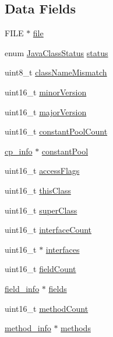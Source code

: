\subsection*{Data Fields}
\begin{DoxyCompactItemize}
\item 
F\+I\+LE $\ast$ \hyperlink{structJavaClass_a24301fe0d812773595ca16c4ee658318}{file}
\item 
enum \hyperlink{javaclass_8h_a9b332e6330d199c30e246d4ad8bff5ac}{Java\+Class\+Status} \hyperlink{structJavaClass_aba868ba95744ed4200bd5bba1ad31ffc}{status}
\item 
uint8\+\_\+t \hyperlink{structJavaClass_ae51618e3eb35bfce4a1267d57a686259}{class\+Name\+Mismatch}
\item 
uint16\+\_\+t \hyperlink{structJavaClass_a3961e984041068a78fa5b45414a94a00}{minor\+Version}
\item 
uint16\+\_\+t \hyperlink{structJavaClass_a7e6bc5cab0ffc5091e940cdb3b63e4eb}{major\+Version}
\item 
uint16\+\_\+t \hyperlink{structJavaClass_a89731a6218fb65b228ee1e056c368628}{constant\+Pool\+Count}
\item 
\hyperlink{structcp__info}{cp\+\_\+info} $\ast$ \hyperlink{structJavaClass_ad56dc000ce07c5c6ef57a1ef6f4859e0}{constant\+Pool}
\item 
uint16\+\_\+t \hyperlink{structJavaClass_a305af686b39aafe8248cb4b5af0f5ad4}{access\+Flags}
\item 
uint16\+\_\+t \hyperlink{structJavaClass_ac9af41263ddeabcfafd6464fd82c736f}{this\+Class}
\item 
uint16\+\_\+t \hyperlink{structJavaClass_a08240a259178c4576a82c688f4d3f8a8}{super\+Class}
\item 
uint16\+\_\+t \hyperlink{structJavaClass_a0abfb912729bc17c129e5460ae02dcd3}{interface\+Count}
\item 
uint16\+\_\+t $\ast$ \hyperlink{structJavaClass_a582289dae1229db46bbb8d733edf6a0a}{interfaces}
\item 
uint16\+\_\+t \hyperlink{structJavaClass_ac1568f2faaa136f0877d8a2962c00626}{field\+Count}
\item 
\hyperlink{structfield__info}{field\+\_\+info} $\ast$ \hyperlink{structJavaClass_a84f183bb9d29d499a5e910b9041acd14}{fields}
\item 
uint16\+\_\+t \hyperlink{structJavaClass_a4451678a1ac1921ddb929aced262d1d9}{method\+Count}
\item 
\hyperlink{structmethod__info}{method\+\_\+info} $\ast$ \hyperlink{structJavaClass_ab923c8f31c71ce1602ca21576a48bcb8}{methods}

\end{DoxyCompactItemize}
